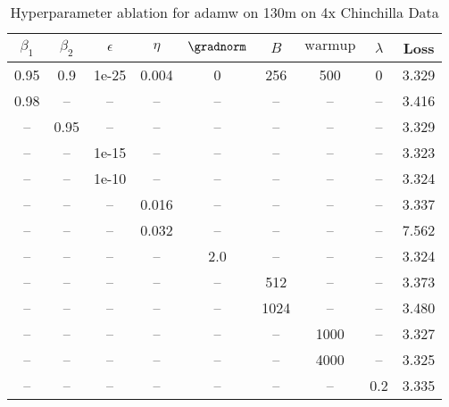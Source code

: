 \begin{table}[h!]
\centering
\caption{Hyperparameter ablation for adamw on 130m on 4x Chinchilla Data}
\label{tab:ablation_adamw_130m_on_4x_chinchilla_data}
\begin{tabular}{ccccccccc}
\toprule
$\beta_1$ & $\beta_2$ & $\epsilon$ & $\eta$ & $\gradnorm$ & $B$ & $\mathrm{warmup}$ & $\lambda$ & Loss \\
\midrule
0.95 & 0.9 & 1e-25 & 0.004 & 0 & 256 & 500 & 0 & 3.329 \\
\midrule
0.98 & -- & -- & -- & -- & -- & -- & -- & 3.416 \\
-- & 0.95 & -- & -- & -- & -- & -- & -- & 3.329 \\
-- & -- & 1e-15 & -- & -- & -- & -- & -- & 3.323 \\
-- & -- & 1e-10 & -- & -- & -- & -- & -- & 3.324 \\
-- & -- & -- & 0.016 & -- & -- & -- & -- & 3.337 \\
-- & -- & -- & 0.032 & -- & -- & -- & -- & 7.562 \\
-- & -- & -- & -- & 2.0 & -- & -- & -- & 3.324 \\
-- & -- & -- & -- & -- & 512 & -- & -- & 3.373 \\
-- & -- & -- & -- & -- & 1024 & -- & -- & 3.480 \\
-- & -- & -- & -- & -- & -- & 1000 & -- & 3.327 \\
-- & -- & -- & -- & -- & -- & 4000 & -- & 3.325 \\
-- & -- & -- & -- & -- & -- & -- & 0.2 & 3.335 \\
\bottomrule
\end{tabular}
\end{table}

